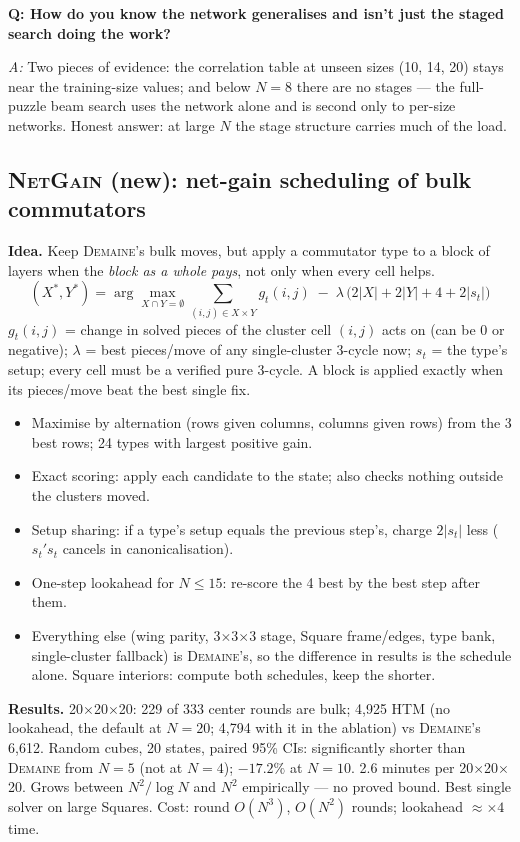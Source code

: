 \documentclass[10.5pt,a4paper]{article}
\newcommand{\Cu}[1]{#1$\times$#1$\times$#1}
\newcommand{\M}[1]{\textsc{#1}}
\newcommand{\Q}[1]{\par\smallskip\textbf{Q: #1}\par}
\newcommand{\A}{\textit{A:} }
\begin{document}
\Q{How do you know the network generalises and isn't just the staged search doing the work?}
\A Two pieces of evidence: the correlation table at unseen sizes (10, 14, 20) stays near the training-size values; and below
$N=8$ there are no stages --- the full-puzzle beam search uses the network alone and is second only to per-size networks.
Honest answer: at large $N$ the stage structure carries much of the load.

\subsection{\M{NetGain} (new): net-gain scheduling of bulk commutators}
\textbf{Idea.} Keep \M{Demaine}'s bulk moves, but apply a commutator type to a block of layers when the \emph{block as a whole pays},
not only when every cell helps.
\[
(X^\ast,Y^\ast)=\arg\max_{X\cap Y=\emptyset}\sum_{(i,j)\in X\times Y} g_t(i,j)\;-\;\lambda\,\bigl(2|X|+2|Y|+4+2|s_t|\bigr)
\]
$g_t(i,j)$ = change in solved pieces of the cluster cell $(i,j)$ acts on (can be $0$ or negative); $\lambda$ = best pieces/move of
any single-cluster 3-cycle now; $s_t$ = the type's setup; every cell must be a verified pure 3-cycle. A block is applied exactly when
its pieces/move beat the best single fix.
\begin{itemize}
\item Maximise by alternation (rows given columns, columns given rows) from the 3 best rows; 24 types with largest positive gain.
\item Exact scoring: apply each candidate to the state; also checks nothing outside the clusters moved.
\item Setup sharing: if a type's setup equals the previous step's, charge $2|s_t|$ less ($s_t' s_t$ cancels in canonicalisation).
\item One-step lookahead for $N\le15$: re-score the 4 best by the best step after them.
\item Everything else (wing parity, \Cu{3} stage, Square frame/edges, type bank, single-cluster fallback) is \M{Demaine}'s, so the
difference in results is the schedule alone. Square interiors: compute both schedules, keep the shorter.
\end{itemize}
\textbf{Results.} \Cu{20}: 229 of 333 center rounds are bulk; 4,925 HTM (no lookahead, the default at $N=20$; 4,794 with it in the ablation) vs \M{Demaine}'s 6,612.
Random cubes, 20 states, paired 95\% CIs: significantly shorter than \M{Demaine} from $N=5$ (not at $N=4$); $-17.2\%$ at $N=10$.
2.6 minutes per \Cu{20}. Grows between $N^2/\log N$ and $N^2$ empirically --- no proved bound. Best single solver on large Squares.
Cost: round $O(N^3)$, $O(N^2)$ rounds; lookahead $\approx\times4$ time.
\end{document}
